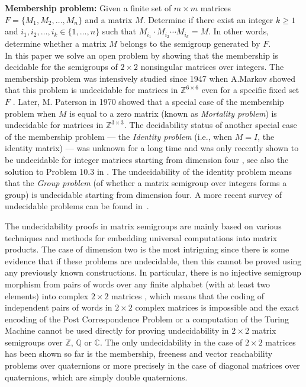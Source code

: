 \documentclass[fontsize=11pt,DIV=13,paper=letter]{scrartcl}
\theoremstyle{definition}
\newcommand{\Z}{\mathbb{Z}}
\begin{document}
\noindent
{\bf Membership problem:} Given a finite set of $m \times m$ matrices $F=\{M_1,M_2, \ldots ,M_n\}$  and a matrix $M$.
Determine if there exist an integer $k \ge 1$ and $i_1,i_2,\ldots ,i_k \in \{1,\ldots ,n\}$ such that 
$M_{i_1} \cdot M_{i_2}  \cdots  M_{i_k}=M$.
In other words, determine whether a matrix $M$ belongs to the semigroup generated by $F$.\\

In this paper we solve an open problem by showing that  
the membership is decidable
for the semigroups of $2 \times 2$ nonsingular matrices over integers.
The membership problem was intensively studied since 1947 when A.Markov showed that 
this problem is undecidable for matrices in $\Z^{6 \times 6}$ even for a specific fixed set $F$ \cite{Markov}. 
Later, M. Paterson in 1970 showed that a special case of the membership problem when $M$ is equal to a zero matrix (known as {\sl Mortality problem})
is undecidable for matrices in $\Z^{3 \times 3}$. The decidability status of another special case of 
the membership problem --- the {\sl Identity problem} (i.e., when $M=I$, the identity matrix) --- was unknown for a long time and
was only recently shown to be undecidable for integer matrices starting from dimension four \cite{Identity}, see also the solution to Problem 10.3 in \cite{solution10-3}. The undecidability of the
identity problem means that the {\sl Group problem} (of whether a matrix semigroup over integers forms a group) is undecidable 
starting from dimension four. A more recent survey of undecidable problems can be found in~\cite{CassaigneHHN14}.

The undecidability proofs in matrix semigroups are mainly based on  various techniques and methods for embedding
universal computations into matrix products. The case of dimension two is the most intriguing
since there is some evidence that if these problems are undecidable, then this cannot be proved using 
any previously known constructions. In particular, there is no injective semigroup morphism from pairs of words over any finite
alphabet (with at least two elements) into complex $2 \times 2$ matrices \cite{CHK99},
which means that the coding of independent pairs of words in $2 \times 2$ complex matrices is impossible and the exact encoding of
the Post Correspondence Problem or a computation of the Turing Machine cannot be used directly for proving undecidability
in $2 \times 2$ matrix semigroups over $\mathbb{Z}$, $\mathbb{Q}$ or $\mathbb{C}$.
The only undecidability in the case of $2 \times 2$ matrices has been shown so far is the membership, 
freeness and vector reachability problems over quaternions \cite{BP_IC2008} or more precisely in the case of diagonal matrices over quaternions, 
which are simply double quaternions.
 
\end{document}
